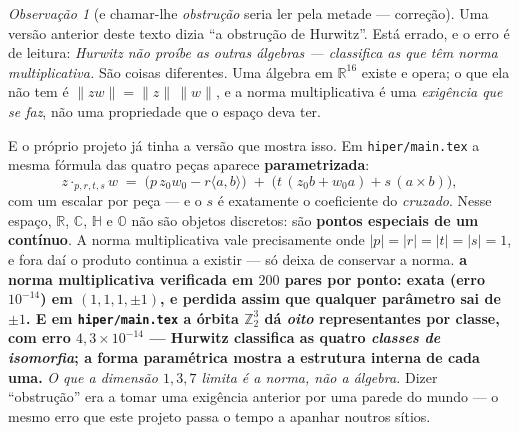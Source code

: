 \documentclass[11pt]{article}
\providecommand{\Oo}{\mathbb O}
\newcommand{\code}[1]{\texttt{\small #1}}
\newcommand{\Z}{\mathbb Z}
\newcommand{\R}{\mathbb R}
\newcommand{\C}{\mathbb C}
\newcommand{\Hq}{\mathbb H}
\theoremstyle{plain}
\theoremstyle{remark}
\newtheorem{obs}{Observação}
\providecommand{\medido}[1]{\textbf{#1}}
\begin{document}
\begin{obs}[e chamar-lhe \emph{obstrução} seria ler pela metade --- correção]
Uma versão anterior deste texto dizia ``a obstrução de Hurwitz''. Está errado, e o erro é de
leitura: \emph{Hurwitz não proíbe as outras álgebras --- classifica as que têm norma
multiplicativa.} São coisas diferentes. Uma álgebra em $\R^{16}$ existe e opera; o que ela não
tem é $\|zw\|=\|z\|\,\|w\|$, e a norma multiplicativa é uma \emph{exigência que se faz}, não uma
propriedade que o espaço deva ter.

E o próprio projeto já tinha a versão que mostra isso. Em \code{hiper/main.tex} a mesma fórmula
das quatro peças aparece \textbf{parametrizada}:
\[
 z\cdot_{p,r,t,s}w \;=\; \bigl(p\,z_0w_0 - r\langle a,b\rangle\bigr)
 \;+\; \bigl(t\,(z_0b+w_0a) + s\,(a\times b)\bigr),
\]
com um escalar por peça --- e o $s$ é exatamente o coeficiente do \emph{cruzado}. Nesse espaço,
$\R$, $\C$, $\Hq$ e $\Oo$ não são objetos discretos: são \textbf{pontos especiais de um contínuo}.
A norma multiplicativa vale precisamente onde $|p|=|r|=|t|=|s|=1$, e fora daí o produto continua a
existir --- só deixa de conservar a norma.
\medido{a norma multiplicativa verificada em $200$ pares por ponto: exata (erro $10^{-14}$) em
$(1,1,1,\pm1)$, e perdida assim que qualquer parâmetro sai de $\pm1$. E em \code{hiper/main.tex}
a órbita $\Z_2^3$ dá \emph{oito} representantes por classe, com erro $4{,}3\times10^{-14}$ ---
Hurwitz classifica as quatro \emph{classes de isomorfia}; a forma paramétrica mostra a estrutura
interna de cada uma.}
\emph{O que a dimensão $1,3,7$ limita é a norma, não a álgebra.} Dizer ``obstrução'' era a
tomar uma exigência anterior por uma parede do mundo --- o mesmo erro que este projeto passa o tempo
a apanhar noutros sítios.
\end{obs}
\end{document}
